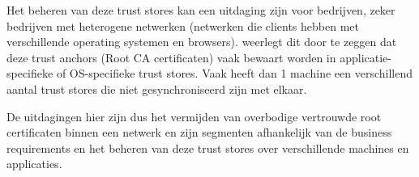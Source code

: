 Het beheren van deze trust stores kan een uitdaging zijn voor bedrijven, zeker bedrijven met heterogene netwerken (netwerken die clients hebben met verschillende operating systemen en browsers).
\textcite{rfc6024} weerlegt dit door te zeggen dat deze trust anchors (Root CA certificaten) vaak bewaart worden in applicatie-specifieke of OS-specifieke trust stores.
Vaak heeft dan 1 machine een verschillend aantal trust stores die niet gesynchroniseerd zijn met elkaar. \break

De uitdagingen hier zijn dus het vermijden van overbodige vertrouwde root certificaten binnen een netwerk en zijn segmenten afhankelijk van de business requirements en het beheren van deze trust stores over verschillende machines en applicaties. 


%




